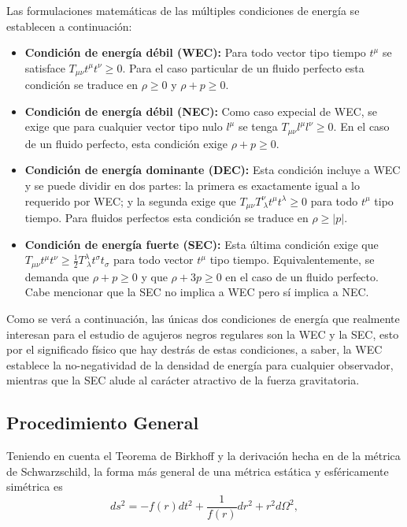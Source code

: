 \documentclass[16pt,a4paper]{article}
\numberwithin{equation}{section}
\theoremstyle{definition}
\begin{document}
Las formulaciones matemáticas de las múltiples  condiciones de energía se establecen a continuación:

\begin{itemize}
\item \textbf{Condición de energía débil (WEC):} Para todo vector tipo tiempo $t^\mu$ se satisface $T_{\mu \nu}t^{\mu}t^{\nu} \geq 0$. Para el caso particular de un fluido perfecto esta condición se traduce en $\rho \geq 0$ y $\rho + p \geq 0$.

\item \textbf{Condición de energía débil (NEC):} Como caso expecial de WEC, se exige que para cualquier vector tipo nulo $l^\mu$ se tenga $T_{\mu \nu}l^{\mu}l^{\nu} \geq 0$. En el caso de un fluido perfecto, esta condición exige $\rho + p \geq 0$.

\item \textbf{Condición de energía dominante (DEC):} Esta condición incluye a WEC y se puede dividir en dos partes: la primera es exactamente igual a lo requerido por WEC; y la segunda exige que $T_{\mu \nu}T^{\nu}_{\ \lambda}t^{\mu}t^{\lambda} \geq 0$ para todo $t^{\mu}$ tipo tiempo. Para fluidos perfectos esta condición se traduce en $\rho \geq |p|$.

\item \textbf{Condición de energía fuerte (SEC):} Esta última condición exige que $T_{\mu \nu}t^{\mu}t^{\nu} \geq \frac{1}{2}T^{\lambda}_{\ \lambda}t^{\sigma}t_{\sigma}$ para todo vector $t^\mu$ tipo tiempo. Equivalentemente, se demanda que $\rho + p \geq 0$ y que $\rho + 3p \geq 0$ en el caso de un fluido perfecto. Cabe mencionar que la SEC no implica a WEC pero sí implica a NEC.
\end{itemize}

Como se verá a continuación, las únicas dos condiciones de energía que realmente interesan para el estudio de agujeros negros regulares son la WEC y la SEC, esto por el significado físico que hay destrás de estas condiciones, a saber, la WEC establece la no-negatividad de la densidad de energía para cualquier observador, mientras que la SEC alude al carácter atractivo de la fuerza gravitatoria.\\

\subsection{Procedimiento General}

Teniendo en cuenta el Teorema de Birkhoff \cite{gravitation} y la derivación hecha en \cite[Cap. 7]{carroll-lecture-notes} de la métrica de Schwarzschild, la forma más general de una métrica estática y esféricamente simétrica es
\begin{equation}
\label{general static spherical}
ds^2 = -f(r)dt^2 + \frac{1}{f(r)}dr^2 + r^2d\Omega^2,
\end{equation}
\end{document}
